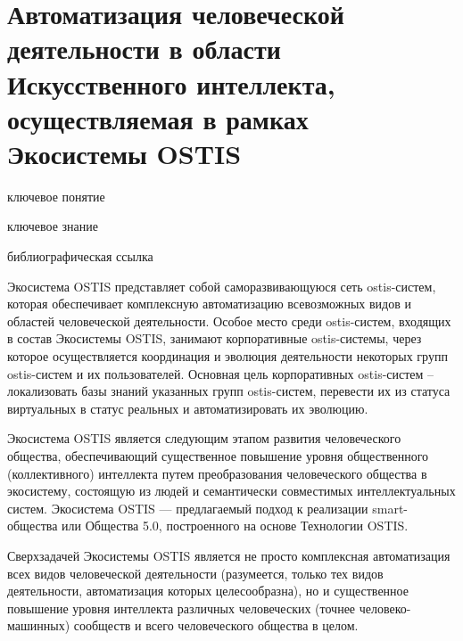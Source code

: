 \section{Автоматизация человеческой деятельности в области Искусственного интеллекта, осуществляемая в рамках Экосистемы OSTIS}
{\label{sec_human_activity_automation}} 

\begin{SCn}

\bigskip

\begin{scnrelfromlist}{ключевое понятие}
\end{scnrelfromlist}

\bigskip

\begin{scnrelfromlist}{ключевое знание}
\end{scnrelfromlist}

\bigskip

\begin{scnrelfromlist}{библиографическая ссылка}
\end{scnrelfromlist}

\end{SCn}

Экосистема OSTIS представляет собой саморазвивающуюся сеть ostis-систем, которая обеспечивает комплексную автоматизацию всевозможных видов и областей человеческой деятельности. 
Особое место среди ostis-систем, входящих в состав Экосистемы OSTIS, занимают корпоративные ostis-системы, через которое осуществляется координация и эволюция деятельности некоторых групп ostis-систем и их пользователей. 
Основная цель корпоративных ostis-систем – локализовать базы знаний указанных групп ostis-систем, перевести их из статуса виртуальных в статус реальных и автоматизировать их эволюцию.

Экосистема OSTIS является следующим этапом развития человеческого общества, обеспечивающий существенное повышение уровня общественного (коллективного) интеллекта путем преобразования человеческого общества в экосистему, состоящую из людей и семантически совместимых интеллектуальных систем. 
Экосистема OSTIS --- предлагаемый подход к реализации smart-общества или Общества 5.0, построенного на основе Технологии OSTIS.

Сверхзадачей Экосистемы OSTIS является не просто комплексная автоматизация всех видов человеческой деятельности (разумеется, только тех видов деятельности, автоматизация которых целесообразна), но и существенное повышение уровня интеллекта различных человеческих (точнее человеко-машинных) сообществ и всего человеческого общества в целом.